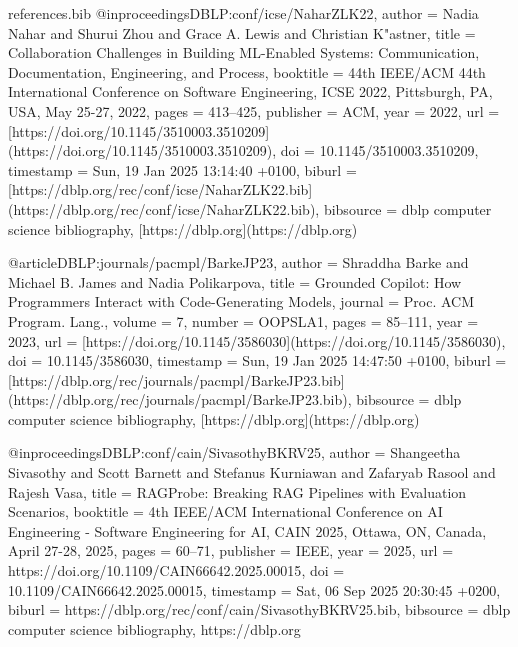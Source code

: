 \begin{filecontents*}{references.bib}
    @inproceedings{DBLP:conf/icse/NaharZLK22,
    author       = {Nadia Nahar and
    Shurui Zhou and
    Grace A. Lewis and
    Christian K{"{a}}stner},
    title        = {Collaboration Challenges in Building ML-Enabled Systems: Communication,
    Documentation, Engineering, and Process},
    booktitle    = {44th {IEEE/ACM} 44th International Conference on Software Engineering,
    {ICSE} 2022, Pittsburgh, PA, USA, May 25-27, 2022},
    pages        = {413--425},
    publisher    = {{ACM}},
    year         = {2022},
    url          = {[https://doi.org/10.1145/3510003.3510209}](https://doi.org/10.1145/3510003.3510209),
    doi          = {10.1145/3510003.3510209},
    timestamp    = {Sun, 19 Jan 2025 13:14:40 +0100},
    biburl       = {[https://dblp.org/rec/conf/icse/NaharZLK22.bib}](https://dblp.org/rec/conf/icse/NaharZLK22.bib),
    bibsource    = {dblp computer science bibliography, [https://dblp.org}](https://dblp.org)
    }
    
    @article{DBLP:journals/pacmpl/BarkeJP23,
    author       = {Shraddha Barke and
    Michael B. James and
    Nadia Polikarpova},
    title        = {Grounded Copilot: How Programmers Interact with Code-Generating Models},
    journal      = {Proc. {ACM} Program. Lang.},
    volume       = {7},
    number       = {{OOPSLA1}},
    pages        = {85--111},
    year         = {2023},
    url          = {[https://doi.org/10.1145/3586030}](https://doi.org/10.1145/3586030),
    doi          = {10.1145/3586030},
    timestamp    = {Sun, 19 Jan 2025 14:47:50 +0100},
    biburl       = {[https://dblp.org/rec/journals/pacmpl/BarkeJP23.bib}](https://dblp.org/rec/journals/pacmpl/BarkeJP23.bib),
    bibsource    = {dblp computer science bibliography, [https://dblp.org}](https://dblp.org)
    }
    
    @inproceedings{DBLP:conf/cain/SivasothyBKRV25,
      author       = {Shangeetha Sivasothy and
                      Scott Barnett and
                      Stefanus Kurniawan and
                      Zafaryab Rasool and
                      Rajesh Vasa},
      title        = {RAGProbe: Breaking {RAG} Pipelines with Evaluation Scenarios},
      booktitle    = {4th {IEEE/ACM} International Conference on {AI} Engineering - Software
                      Engineering for AI, {CAIN} 2025, Ottawa, ON, Canada, April 27-28,
                      2025},
      pages        = {60--71},
      publisher    = {{IEEE}},
      year         = {2025},
      url          = {https://doi.org/10.1109/CAIN66642.2025.00015},
      doi          = {10.1109/CAIN66642.2025.00015},
      timestamp    = {Sat, 06 Sep 2025 20:30:45 +0200},
      biburl       = {https://dblp.org/rec/conf/cain/SivasothyBKRV25.bib},
      bibsource    = {dblp computer science bibliography, https://dblp.org}
    }
    

\end{filecontents*}
